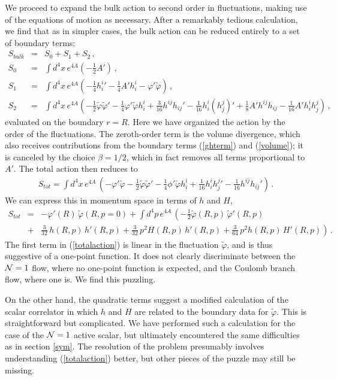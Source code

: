 \documentclass[a4paper,12pt]{article}
\def\varphit{\tilde{\varphi}}
\begin{document}
We proceed to expand the bulk action to second order in fluctuations,
making use of the equations of motion as necessary.  After a
remarkably tedious calculation, we find that as in simpler cases, the
bulk action can be reduced entirely to a set of boundary terms:
\begin{eqnarray}
S_{bulk} &=& S_0 + S_1 + S_2 \,, \nonumber \\
S_0 &=& \int d^4x \, e^{4A} \left (- \frac{1}{2} A' \right)\,, \\
S_1 &=& \int d^4x \, e^{4A} \left(- \frac{1}{4} h^i_i{}' - \frac{1}{4} A' h^i_i - \varphi' \varphit \right) \,, \nonumber \\
S_2 &=&
\int d^4x \, e^{4A}\left( - \frac{1}{2} \varphit \varphit' - \frac{1}{4}
\varphi' \varphit h^i_i + \frac{3}{16} h^{ij} h_{ij}' - \frac{1}{16}
h^i_i (h^j_j)' + \frac{1}{8} A' h^{ij} h_{ij} - \frac{1}{16}
A' h^i_i h^j_j \right) \,, \nonumber
\end{eqnarray}
evaluated on the boundary $r=R$.
Here we have organized the action by the order of the fluctuations.
The zeroth-order term is the volume divergence, which also receives
contributions from the boundary terms (\ref{ghterm}) and
(\ref{volume}); it is canceled by the choice $\beta = 1/2$, which in
fact removes all terms proportional to $A'$.  The total action then
reduces to 
\begin{eqnarray}
S_{tot} = \int d^4x \, e^{4A} \, \left(- \varphi' \varphit -
\frac{1}{2} \varphit \varphit' - \frac{1}{4} \phi' \varphit h^i_i +
\frac{1}{16} h^i_i h^j_j{}' - \frac{1}{16} h^{ij} h_{ij}' \right) \,.
\end{eqnarray}
We can express this in momentum space in terms of $h$ and $H$,
\begin{eqnarray}
\label{totalaction}
S_{tot} &=& - \varphi'(R) \, \varphit(R,p=0) + \int d^4p \, e^{4A} \,
 \left( - \frac{1}{2} \varphit(R,p) \, \varphit'(R,p)\right. \\ &+&
 \left. \frac{3}{32} \, h(R,p) \, h'(R,p) +\frac{3}{32} \, p^2 H(R,p)
 \, h'(R,p) + \frac{3}{64} \, p^2 h(R,p) \, H'(R,p) \right) \,.
 \nonumber
\end{eqnarray}
The first term in (\ref{totalaction}) is linear in the fluctuation
$\varphit$, and is thus suggestive of a one-point function. It does
not clearly discriminate between the ${\cal N}=1$ flow, where no
one-point function is expected, and the Coulomb branch flow, where
one is. We find this puzzling.

On the other hand, the quadratic terms suggest a modified calculation
of the scalar correlator in which $h$ and $H$ are related to the
boundary data for $\varphit$.  This is straightforward but
complicated.  We have performed such a calculation for the case of the
${\cal N}=1$ active scalar, but ultimately encountered the same
difficulties as in section \ref{sym}.  The resolution of the problem
presumably involves understanding (\ref{totalaction}) better, but
other pieces of the puzzle may still be missing.
\end{document}

